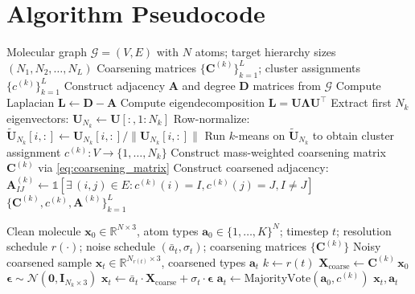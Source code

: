 \documentclass[12pt,a4paper]{article}
\providecommand{\R}{}
\renewcommand{\R}{\mathbb{R}}
\newcommand{\bx}{\bm{x}}
\newcommand{\bep}{\bm{\epsilon}}
\newcommand{\cN}{\mathcal{N}}
\newcommand{\cG}{\mathcal{G}}
\newcommand{\Lap}{\bm{L}}
\newcommand{\adj}{\bm{A}}
\newcommand{\degmat}{\bm{D}}
\begin{document}
\section{Algorithm Pseudocode}\label{sec:algorithms}

\begin{algorithm}[H]
\caption{Spectral Graph Coarsening}\label{alg:coarsening}
\begin{algorithmic}[1]
\Require Molecular graph $\cG = (V, E)$ with $N$ atoms; target hierarchy sizes $(N_1, N_2, \ldots, N_L)$
\Ensure Coarsening matrices $\{\bm{C}^{(k)}\}_{k=1}^L$; cluster assignments $\{c^{(k)}\}_{k=1}^L$
\State Construct adjacency $\adj$ and degree $\degmat$ matrices from $\cG$
\State Compute Laplacian $\Lap \gets \degmat - \adj$
\State Compute eigendecomposition $\Lap = \bm{U} \bm{\Lambda} \bm{U}^\top$
    \State Extract first $N_k$ eigenvectors: $\bm{U}_{N_k} \gets \bm{U}[:, 1:N_k]$
    \State Row-normalize: $\tilde{\bm{U}}_{N_k}[i,:] \gets \bm{U}_{N_k}[i,:] / \|\bm{U}_{N_k}[i,:]\|$
    \State Run $k$-means on $\tilde{\bm{U}}_{N_k}$ to obtain cluster assignment $c^{(k)}: V \to \{1,\ldots,N_k\}$
    \State Construct mass-weighted coarsening matrix $\bm{C}^{(k)}$ via \cref{eq:coarsening_matrix}
    \State Construct coarsened adjacency: $\adj^{(k)}_{IJ} \gets \mathds{1}\!\left[\exists\, (i,j) \in E : c^{(k)}(i) = I, c^{(k)}(j) = J, I \neq J\right]$
\EndFor
\State \Return $\{\bm{C}^{(k)}, c^{(k)}, \adj^{(k)}\}_{k=1}^L$
\end{algorithmic}
\end{algorithm}

\begin{algorithm}[H]
\caption{MolSSD Forward Process}\label{alg:forward}
\begin{algorithmic}[1]
\Require Clean molecule $\bx_0 \in \R^{N \times 3}$, atom types $\bm{a}_0 \in \{1,\ldots,K\}^N$; timestep $t$; resolution schedule $r(\cdot)$; noise schedule $(\bar{a}_t, \sigma_t)$; coarsening matrices $\{\bm{C}^{(k)}\}$
\Ensure Noisy coarsened sample $\bx_t \in \R^{N_{r(t)} \times 3}$, coarsened types $\bm{a}_t$
\State $k \gets r(t)$ 
\State $\bm{X}_{\text{coarse}} \gets \bm{C}^{(k)}\, \bx_0$ 
\State $\bep \sim \cN(\bm{0}, \bm{I}_{N_k \times 3})$ 
\State $\bx_t \gets \bar{a}_t \cdot \bm{X}_{\text{coarse}} + \sigma_t \cdot \bep$ 
\State $\bm{a}_t \gets \text{MajorityVote}(\bm{a}_0, c^{(k)})$ 
\State \Return $\bx_t, \bm{a}_t$
\end{algorithmic}
\end{algorithm}
\end{document}
